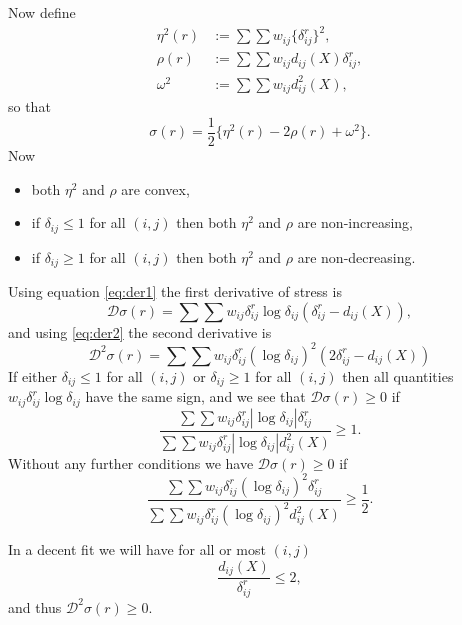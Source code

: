 \documentclass[
  12pt,
]{article}
\providecommand{\tightlist}{%
  \setlength{\itemsep}{0pt}\setlength{\parskip}{0pt}}
\begin{document}
Now define
\begin{subequations}
\begin{align}
\eta^2(r)&:=\sum\sum w_{ij}\{\delta_{ij}^r\}^2,\\
\rho(r)&:=\sum\sum w_{ij}d_{ij}(X)\delta_{ij}^r,\\
\omega^2&:=\sum\sum w_{ij}d_{ij}^2(X),
\end{align}
\end{subequations}
so that
\begin{equation}
\sigma(r)=\frac12\{\eta^2(r)-2\rho(r)+\omega^2\}.
\end{equation}
Now

\begin{itemize}
\tightlist
\item
  both \(\eta^2\) and \(\rho\) are convex,
\item
  if \(\delta_{ij}\leq 1\) for all \((i,j)\) then both
  \(\eta^2\) and \(\rho\) are non-increasing,
\item
  if \(\delta_{ij}\geq 1\) for all \((i,j)\) then both
  \(\eta^2\) and \(\rho\) are non-decreasing.
\end{itemize}

Using equation \eqref{eq:der1} the first derivative of stress is
\begin{equation}
\mathcal{D}\sigma(r)=\sum\sum w_{ij}\delta_{ij}^r\log\delta_{ij}(\delta_{ij}^r-d_{ij}(X)),
\label{eq:first}
\end{equation}
and using \eqref{eq:der2} the second derivative is
\begin{equation}
\mathcal{D}^2\sigma(r)=\sum\sum w_{ij}\delta_{ij}^r(\log\delta_{ij})^2(2\delta_{ij}^r-d_{ij}(X))
\label{eq:second}
\end{equation}
If either \(\delta_{ij}\leq 1\) for all \((i,j)\) or
\(\delta_{ij}\geq 1\) for all \((i,j)\) then all
quantities \(w_{ij}\delta_{ij}^r\log\delta_{ij}\)
have the same sign, and we see that \(\mathcal{D}\sigma(r)\geq 0\)
if
\[\frac{\sum\sum w_{ij}\delta_{ij}^r|\log\delta_{ij}|\delta_{ij}^r}
{\sum\sum w_{ij}\delta_{ij}^r|\log\delta_{ij}|d_{ij}^2(X)}\geq 1.
\]
Without any further conditions we have \(\mathcal{D}\sigma(r)\geq 0\)
if
\[\frac{\sum\sum w_{ij}\delta_{ij}^r(\log\delta_{ij})^2\delta_{ij}^r}
{\sum\sum w_{ij}\delta_{ij}^r(\log\delta_{ij})^2d_{ij}^2(X)}\geq\frac12.
\]

In a decent fit we will have for all or most \((i,j)\)\\
\begin{equation}
\frac{d_{ij}(X)}{\delta_{ij}^r}\leq 2,
\label{eq:decent}
\end{equation}
and thus \(\mathcal{D}^2\sigma(r)\geq 0\).
\end{document}
